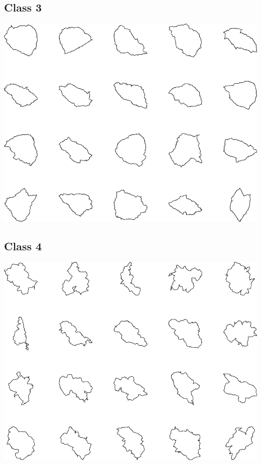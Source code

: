 \documentclass{book}
\begin{document}
\subsection{Class 3}
\includegraphics[width=6in]{output/3.learning/scaled_nts/scaled_nts_3.png}
\subsection{Class 4}
\includegraphics[width=6in]{output/3.learning/scaled_nts/scaled_nts_4.png}
\end{document}
